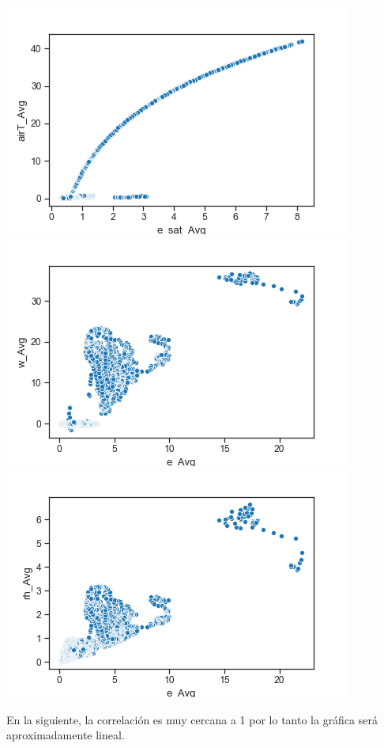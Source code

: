 \documentclass{article}
\begin{document}
\begin{center}
    \includegraphics[scale = 0.5]{corr5.png}
    \includegraphics[scale = 0.5]{corr6.png}
    \includegraphics[scale = 0.5]{corr7.png}
\end{center}

\clearpage

En la siguiente, la correlación es muy cercana a 1 por lo tanto la gráfica será aproximadamente lineal.
\end{document}
